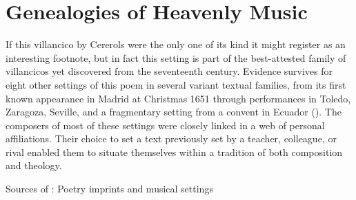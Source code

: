 \section{Genealogies of Heavenly Music}

If this villancico by Cererols were the only one of its kind it might register
as an interesting footnote, but in fact this setting is part of the
best-attested family of villancicos yet discovered from the seventeenth century.
Evidence survives for eight other settings of this poem in several variant
textual families, from its first known appearance in Madrid at Christmas 1651
through performances in Toledo, Zaragoza, Seville, and a fragmentary setting
from a convent in Ecuador ().
The composers of most of these settings were closely linked in a web of personal
affiliations.
Their choice to set a text previously set by a teacher, colleague, or rival
enabled them to situate themselves within a tradition of both composition and
theology.


\begin{table}
    \caption{Sources of : Poetry
    imprints and musical settings}
    \label{tab:suspended-sources}
\end{table}

